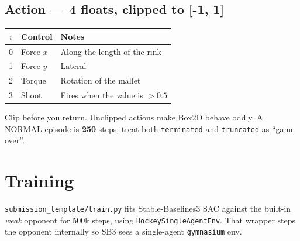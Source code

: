 \documentclass[11pt,a4paper]{article}
\begin{document}
\subsection{Action --- 4 floats, clipped to [-1, 1]}

\begin{center}
\begin{tabular}{@{}cl p{9.2cm}@{}}
\toprule
\sffamily\bfseries $i$ & \sffamily\bfseries Control & \sffamily\bfseries Notes \\
\midrule
0 & Force $x$ & Along the length of the rink \\
1 & Force $y$ & Lateral \\
2 & Torque    & Rotation of the mallet \\
3 & Shoot     & Fires when the value is $> 0.5$ \\
\bottomrule
\end{tabular}
\end{center}

Clip before you return. Unclipped actions make Box2D behave oddly. A NORMAL episode is \textbf{250} steps; treat both \texttt{terminated} and \texttt{truncated} as ``game over''.

\begin{center}
\end{center}

\section{Training}

\texttt{submission\_template/train.py} fits Stable-Baselines3 SAC against the built-in \emph{weak} opponent for 500k steps, using \texttt{HockeySingleAgentEnv}. That wrapper steps the opponent internally so SB3 sees a single-agent \texttt{gymnasium} env.
\end{document}
